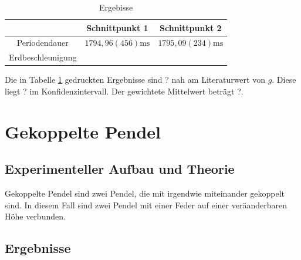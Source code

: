 \documentclass[11pt, a4paper]{article}
\begin{document}
    \begin{table}
        \centering
        \begin{tabular}{c c c}
            & Schnittpunkt 1 & Schnittpunkt 2 \\ \hline
            Periodendauer &  $1794,96(456)\si{\milli\second} $ & $1795,09(234)\si{\milli\second} $ \\
            Erdbeschleunigung & &
        \end{tabular}
        \caption{Ergebisse}
        \label{ergrev}
    \end{table}

    Die in Tabelle \ref{ergrev} gedruckten Ergebnisse sind ? nah am Literaturwert von $g$. Diese liegt ?
    im Konfidenzintervall. Der gewichtete Mittelwert beträgt ?.

    \section{Gekoppelte Pendel}

    \subsection{Experimenteller Aufbau und Theorie}

    Gekoppelte Pendel sind zwei Pendel, die mit irgendwie miteinander gekoppelt sind. In diesem Fall sind
    zwei Pendel mit einer Feder auf einer veräanderbaren Höhe verbunden. 

    \subsection{Ergebnisse}

    
    
\end{document}
